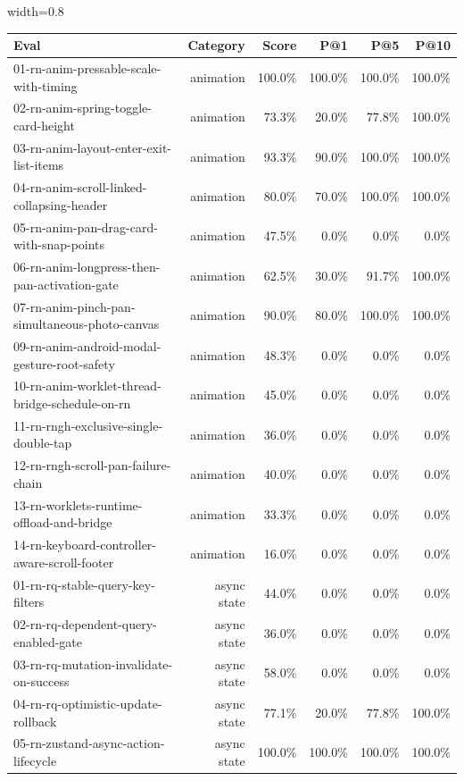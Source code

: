 \begin{table}[htbp]
\centering
\begin{adjustbox}{width=0.8\textwidth}
\begin{tabular}{lrrrrr}
\toprule
Eval & Category & Score & P@1 & P@5 & P@10 \\
\midrule
01-rn-anim-pressable-scale-with-timing & animation & 100.0\% & 100.0\% & 100.0\% & 100.0\% \\
02-rn-anim-spring-toggle-card-height & animation & 73.3\% & 20.0\% & 77.8\% & 100.0\% \\
03-rn-anim-layout-enter-exit-list-items & animation & 93.3\% & 90.0\% & 100.0\% & 100.0\% \\
04-rn-anim-scroll-linked-collapsing-header & animation & 80.0\% & 70.0\% & 100.0\% & 100.0\% \\
05-rn-anim-pan-drag-card-with-snap-points & animation & 47.5\% & 0.0\% & 0.0\% & 0.0\% \\
06-rn-anim-longpress-then-pan-activation-gate & animation & 62.5\% & 30.0\% & 91.7\% & 100.0\% \\
07-rn-anim-pinch-pan-simultaneous-photo-canvas & animation & 90.0\% & 80.0\% & 100.0\% & 100.0\% \\
09-rn-anim-android-modal-gesture-root-safety & animation & 48.3\% & 0.0\% & 0.0\% & 0.0\% \\
10-rn-anim-worklet-thread-bridge-schedule-on-rn & animation & 45.0\% & 0.0\% & 0.0\% & 0.0\% \\
11-rn-rngh-exclusive-single-double-tap & animation & 36.0\% & 0.0\% & 0.0\% & 0.0\% \\
12-rn-rngh-scroll-pan-failure-chain & animation & 40.0\% & 0.0\% & 0.0\% & 0.0\% \\
13-rn-worklets-runtime-offload-and-bridge & animation & 33.3\% & 0.0\% & 0.0\% & 0.0\% \\
14-rn-keyboard-controller-aware-scroll-footer & animation & 16.0\% & 0.0\% & 0.0\% & 0.0\% \\
01-rn-rq-stable-query-key-filters & async state & 44.0\% & 0.0\% & 0.0\% & 0.0\% \\
02-rn-rq-dependent-query-enabled-gate & async state & 36.0\% & 0.0\% & 0.0\% & 0.0\% \\
03-rn-rq-mutation-invalidate-on-success & async state & 58.0\% & 0.0\% & 0.0\% & 0.0\% \\
04-rn-rq-optimistic-update-rollback & async state & 77.1\% & 20.0\% & 77.8\% & 100.0\% \\
05-rn-zustand-async-action-lifecycle & async state & 100.0\% & 100.0\% & 100.0\% & 100.0\% \\

\end{tabular}
\end{adjustbox}
\end{table}
